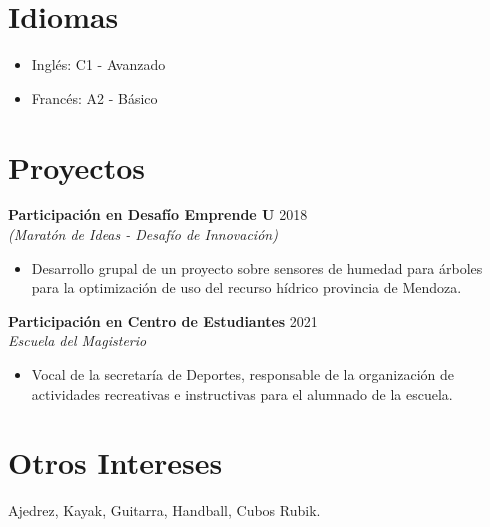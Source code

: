 \documentclass[11pt,a4paper,sans]{article}
\begin{document}
\section{Idiomas}
\begin{itemize}
    \item Inglés: C1 - Avanzado %
    \item Francés: A2 - Básico %
\end{itemize}

\section{Proyectos}
\textbf{Participación en Desafío Emprende U} \hfill 2018 %
\\ \textit{(Maratón de Ideas - Desafío de Innovación)} %
\begin{itemize}
    \item Desarrollo grupal de un proyecto sobre sensores de humedad para árboles para la optimización de uso del recurso hídrico provincia de Mendoza. %
\end{itemize}

\vspace{5pt}

\textbf{Participación en Centro de Estudiantes} \hfill 2021 %
\\ \textit{Escuela del Magisterio} %
\begin{itemize}
    \item Vocal de la secretaría de Deportes, responsable de la organización de actividades recreativas e instructivas para el alumnado de la escuela. %
\end{itemize}

\section{Otros Intereses}
Ajedrez, Kayak, Guitarra, Handball, Cubos Rubik. %
\end{document}
